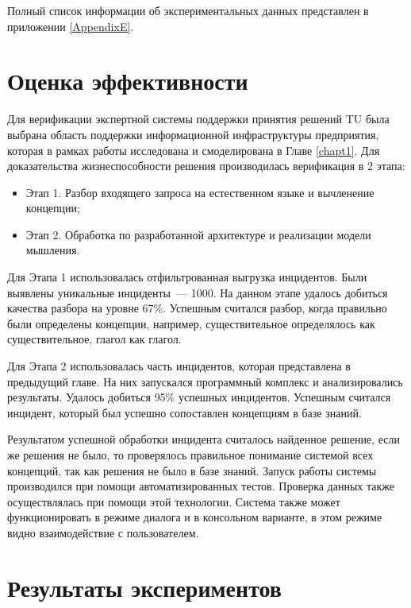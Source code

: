Полный список информации об экспериментальных данных представлен в приложении \ref{AppendixE}.




\section{Оценка эффективности}
Для верификации экспертной системы поддержки принятия решений TU была выбрана область поддержки информационной инфраструктуры предприятия, которая в рамках работы исследована и смоделирована в Главе \ref{chapt1}. 
Для доказательства жизнеспособности решения производилась верификация в 2 этапа:
\begin{itemize}
	\item Этап 1. Разбор входящего запроса на естественном языке и вычленение концепции;
	\item Этап 2. Обработка по разработанной архитектуре и реализации модели мышления.  
\end{itemize} \par
Для Этапа 1 использовалась отфильтрованная выгрузка инцидентов. Были выявлены уникальные инциденты~--- 1000. На данном этапе удалось добиться качества разбора на уровне 67\%. Успешным считался разбор, когда правильно были определены концепции, например, существительное определялось как существительное, глагол как глагол. \par
Для Этапа 2 использовалась часть инцидентов, которая представлена в предыдущий главе. На них запускался программный комплекс и анализировались результаты. Удалось добиться 95\% успешных инцидентов. Успешным считался инцидент, который был успешно сопоставлен концепциям в базе знаний. \par
Результатом успешной обработки инцидента считалось найденное решение, если же решения не было, то проверялось правильное понимание системой всех концепций, так как решения не было в базе знаний. Запуск работы системы производился при помощи автоматизированных тестов. Проверка данных также осуществлялась при помощи этой технологии. Система также может функционировать в режиме диалога и в консольном варианте, в этом режиме видно взаимодействие с пользователем. 



\section{Результаты экспериментов}

